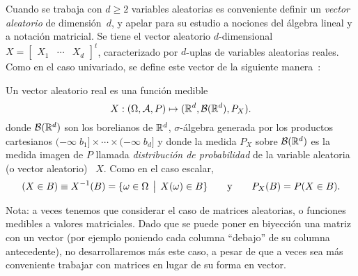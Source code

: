 Cuando se trabaja  con $d \ge 2$ variables aleatorias  es conveniente definir un
{\it vector aleatorio}  de dimensi\'on~$d$, y apelar para  su estudio a nociones
del \'algebra  lineal y  a notaci\'on matricial.   Se tiene el  vector aleatorio
$d$-dimensional \ $X = \begin{bmatrix} X_1 & \cdots & X_d \end{bmatrix}^t$,
caracterizado por  $d$-uplas de  variables aleatorias reales.   Como en  el caso
univariado, se define este  vector de la siguiente manera~\cite{AthLah06, Coh13,
  Bre88}:
%
\begin{definicion}
\label{Def:MP:VectorAleatorioReal}
%
  Un vector aleatorio real es una funci\'on medible
  \[
  X: (\Omega,\mathcal{A},P) \mapsto (\mathbb{R}^d,\mathcal{B}(\mathbb{R}^d),P_X).
  \]
  donde  $\mathcal{B}(\mathbb{R}^d)$  son  los  borelianos  de  $\mathbb{R}^d$,  $\sigma$-\'algebra
  generada por los productos cartesianos  $(-\infty \; b_1] \times \cdots \times
  (-\infty  \;  b_d]$ y  donde la  medida $P_X$  sobre $\mathcal{B}(\mathbb{R}^d)$  es la
  medida  imagen de  $P$  llamada  {\it distribuci\'on  de  probabilidad} de  la
  variable aleatoria (o vector aleatorio) \ $X$. Como en el caso escalar,
 \[
 (X \in B) \equiv X^{-1}(B) = \{ \omega \in \Omega \:\: \big| \:\: X(\omega) \in B \} \qquad
 \mbox{y} \qquad P_X(B) = P(X \in B).
 \]
\end{definicion}
%
\noindent Nota: a veces tenemos que considerar el caso de matrices aleatorias, o
funciones  medibles  a  valores  matriciales.    Dado  que  se  puede  poner  en
biyecci\'on  una  matriz  con  un  vector (por  ejemplo  poniendo  cada  columna
``debajo'' de  su columna  antecedente), no desarrollaremos  m\'as este  caso, a
pesar de que a veces sea m\'as  conveniente trabajar con matrices en lugar de su
forma en vector.

\

